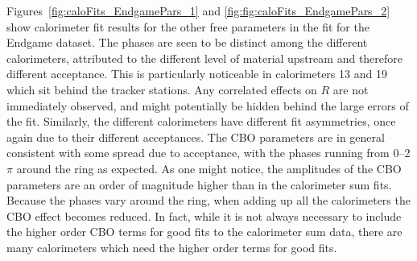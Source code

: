Figures~\ref{fig:caloFits_EndgamePars_1} and \ref{fig:fig:caloFits_EndgamePars_2} show calorimeter fit results for the other free parameters in the fit for the Endgame dataset. The \gmtwo phases are seen to be distinct among the different calorimeters, attributed to the different level of material upstream and therefore different acceptance. This is particularly noticeable in calorimeters 13 and 19 which sit behind the tracker stations. Any correlated effects on $R$ are not immediately observed, and might potentially be hidden behind the large errors of the fit. Similarly, the different calorimeters have different fit asymmetries, once again due to their different acceptances. The CBO parameters are in general consistent with some spread due to acceptance, with the phases running from 0--2$\pi$ around the ring as expected. As one might notice, the amplitudes of the CBO parameters are an order of magnitude higher than in the calorimeter sum fits. Because the phases vary around the ring, when adding up all the calorimeters the CBO effect becomes reduced. In fact, while it is not always necessary to include the higher order CBO terms for good fits to the calorimeter sum data, there are many calorimeters which need the higher order terms for good fits.


